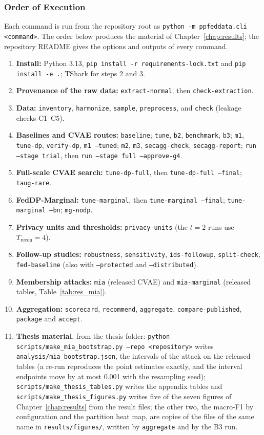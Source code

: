 \subsubsection*{Order of Execution}
Each command is run from the repository root as \texttt{python -m ppfeddata.cli <command>}. The order below produces the material of Chapter~\ref{chap:results}; the repository README gives the options and outputs of every command.
\begin{enumerate}
    \item \textbf{Install:} Python 3.13, \texttt{pip install -r requirements-lock.txt} and \texttt{pip install -e .}; TShark for steps 2 and 3.
    \item \textbf{Provenance of the raw data:} \texttt{extract-normal}, then \texttt{check-extraction}.
    \item \textbf{Data:} \texttt{inventory}, \texttt{harmonize}, \texttt{sample}, \texttt{preprocess}, and \texttt{check} (leakage checks C1--C5).
    \item \textbf{Baselines and CVAE routes:} \texttt{baseline}; \texttt{tune}, \texttt{b2}, \texttt{benchmark}, \texttt{b3}; \texttt{m1}, \texttt{tune-dp}, \texttt{verify-dp}, \texttt{m1 --tuned}; \texttt{m2}, \texttt{m3}, \texttt{secagg-check}, \texttt{secagg-report}; \texttt{run --stage trial}, then \texttt{run --stage full --approve-g4}.
    \item \textbf{Full-scale CVAE search:} \texttt{tune-dp-full}, then \texttt{tune-dp-full --final}; \texttt{taug-rare}.
    \item \textbf{FedDP-Marginal:} \texttt{tune-marginal}, then \texttt{tune-marginal --final}; \texttt{tune-marginal --bn}; \texttt{mg-nodp}.
    \item \textbf{Privacy units and thresholds:} \texttt{privacy-units} (the $t = 2$ runs use $T_{\text{recon}} = 4$).
    \item \textbf{Follow-up studies:} \texttt{robustness}, \texttt{sensitivity}, \texttt{ids-followup}, \texttt{split-check}, \texttt{fed-baseline} (also with \texttt{--protected} and \texttt{--distributed}).
    \item \textbf{Membership attacks:} \texttt{mia} (released CVAE) and \texttt{mia-marginal} (released tables, Table~\ref{tab:res_mia}).
    \item \textbf{Aggregation:} \texttt{scorecard}, \texttt{recommend}, \texttt{aggregate}, \texttt{compare-published}, \texttt{package} and \texttt{accept}.
    \item \textbf{Thesis material}, from the thesis folder: \texttt{python scripts/make\_mia\_bootstrap.py --repo <repository>} writes \texttt{analysis/mia\_bootstrap.json}, the intervals of the attack on the released tables (a re-run reproduces the point estimates exactly, and the interval endpoints move by at most 0.001 with the resampling seed); \texttt{scripts/make\_thesis\_tables.py} writes the appendix tables and \texttt{scripts/make\_thesis\_figures.py} writes five of the seven figures of Chapter~\ref{chap:results} from the result files; the other two, the macro-F1 by configuration and the partition heat map, are copies of the files of the same name in \texttt{results/figures/}, written by \texttt{aggregate} and by the B3 run.
\end{enumerate}
